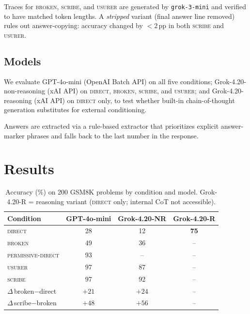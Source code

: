 \documentclass[11pt]{article}
\begin{document}
Traces for \textsc{broken}, \textsc{scribe}, and \textsc{usurer} are generated by
\texttt{grok-3-mini} and verified to have matched token lengths.
A \emph{stripped} variant (final answer line removed) rules out answer-copying: accuracy
changed by $< 2$\,pp in both \textsc{scribe} and \textsc{usurer}.

\subsection{Models}

We evaluate GPT-4o-mini (OpenAI Batch API) on all five conditions; Grok-4.20-non-reasoning
(xAI API) on \textsc{direct}, \textsc{broken}, \textsc{scribe}, and \textsc{usurer}; and
Grok-4.20-reasoning (xAI API) on \textsc{direct} only, to test whether built-in
chain-of-thought generation substitutes for external conditioning.

Answers are extracted via a rule-based extractor that prioritizes explicit answer-marker
phrases and falls back to the last number in the response.

\section{Results}

\begin{table}[t]
\centering
\caption{Accuracy (\%) on 200 GSM8K problems by condition and model.
         Grok-4.20-R = reasoning variant (\textsc{direct} only; internal CoT not accessible).}
\label{tab:main}
\begin{tabular}{lccc}
\toprule
Condition & GPT-4o-mini & Grok-4.20-NR & Grok-4.20-R \\
\midrule
\textsc{direct}            & 28 & 12 & \textbf{75} \\
\textsc{broken}            & 49 & 36 & -- \\
\textsc{permissive-direct} & 93 & -- & -- \\
\textsc{usurer}            & 97 & 87 & -- \\
\textsc{scribe}            & 97 & 92 & -- \\
\midrule
$\Delta$\,broken$-$direct  & $+21$ & $+24$ & -- \\
$\Delta$\,scribe$-$broken  & $+48$ & $+56$ & -- \\
\bottomrule
\end{tabular}
\end{table}
\end{document}
